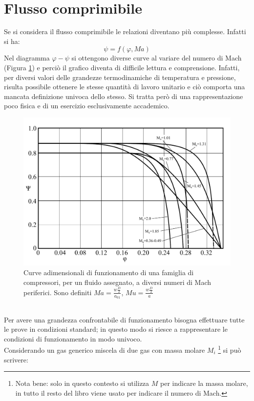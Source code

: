 \section{Flusso comprimibile}
Se si considera il flusso comprimibile le relazioni diventano più complesse. Infatti si ha:
\begin{equation}
\psi=f(\varphi,Ma)
\end{equation}
Nel diagramma $\varphi-\psi$ si ottengono diverse curve al variare del numero di Mach (Figura \ref{fig:ComprMach}) e perciò il grafico diventa di difficile lettura e comprensione. Infatti, per diversi valori delle grandezze termodinamiche di temperatura e pressione, risulta possibile ottenere le stesse quantità di lavoro unitario e ciò comporta una mancata definizione univoca dello stesso. Si tratta però di una rappresentazione poco fisica e di un esercizio esclusivamente accademico.
\begin{figure}[h!]
\centering
  \includegraphics[width=.85\textwidth]{fig/ComprMach.pdf}
\caption{Curve adimensionali di funzionamento di una famiglia di compressori, per un fluido assegnato, a diversi numeri di Mach periferici. Sono definiti $Ma = \frac{w \frac{D}{2}}{a_{01}}$, $Mu = \frac{w \frac{D}{2}}{a}$}
\label{fig:ComprMach}
\end{figure}
\\Per avere una grandezza confrontabile di funzionamento bisogna effettuare tutte le prove in condizioni standard; in questo modo si riesce a rappresentare le condizioni di funzionamento in modo univoco.\\
Considerando un gas generico miscela di due gas con massa molare $M_i$ \footnote{Nota bene: solo in questo contesto si utilizza $M$ per indicare la massa molare, in tutto il resto del libro viene usato per indicare il numero di Mach.} si può scrivere:
